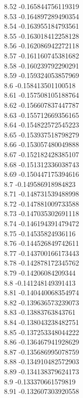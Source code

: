 {8.52	-0.165844756119319\\
8.53	-0.164897289490354\\
8.54	-0.163955184793561\\
8.55	-0.163018412258128\\
8.56	-0.162086942272118\\
8.57	-0.161160745381682\\
8.58	-0.160239792290291\\
8.59	-0.159324053857969\\
8.6	-0.158413501100518\\
8.61	-0.157508105188764\\
8.62	-0.156607837447787\\
8.63	-0.155712669356165\\
8.64	-0.154822572545223\\
8.65	-0.153937518798279\\
8.66	-0.153057480049888\\
8.67	-0.152182428385107\\
8.68	-0.151312336038743\\
8.69	-0.150447175394616\\
8.7	-0.149586918984823\\
8.71	-0.148731539488998\\
8.72	-0.147881009733588\\
8.73	-0.147035302691118\\
8.74	-0.146194391479472\\
8.75	-0.14535824936116\\
8.76	-0.144526849742611\\
8.77	-0.143700166173443\\
8.78	-0.142878172345762\\
8.79	-0.14206084209344\\
8.8	-0.141248149391413\\
8.81	-0.140440068354974\\
8.82	-0.139636573239073\\
8.83	-0.13883763843761\\
8.84	-0.138043238482751\\
8.85	-0.137253348044222\\
8.86	-0.136467941928629\\
8.87	-0.135686995078759\\
8.88	-0.134910482572903\\
8.89	-0.134138379624173\\
8.9	-0.133370661579819\\
8.91	-0.132607303920558\\
}
